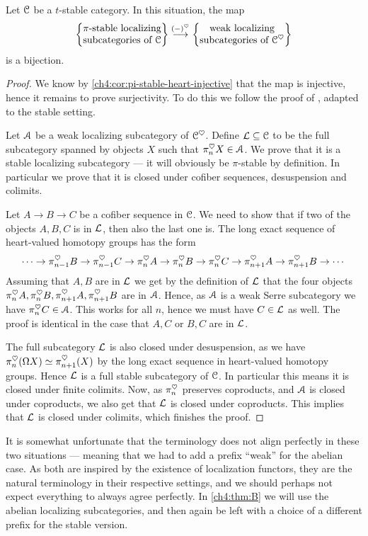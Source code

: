 \begin{theorem}
    \label{ch4:thm:premain}
    Let $\EuScript{C}$ be a $t$-stable category. In this situation, the map 
    \[\left\{ \begin{matrix} \pi\text{-stable localizing}\\ \text{subcategories of }\EuScript{C} \end{matrix} \right\}\overset{(-)^\heartsuit}{\longrightarrow} \left\{ \begin{matrix} \text{weak localizing}\\ \text{subcategories of }\EuScript{C}^\heartsuit \end{matrix} \right\}\] 
    is a bijection. 
\end{theorem}
\begin{proof}
    We know by \cref{ch4:cor:pi-stable-heart-injective} that the map is injective, hence it remains to prove surjectivity. To do this we follow the proof of \cite[C.5.2.7]{lurie_SAG}, adapted to the stable setting. 
    
    Let $\EuScript{A}$ be a weak localizing subcategory of $\EuScript{C}^\heartsuit$. Define $\mathcal{L}\subseteq \EuScript{C}$ to be the full subcategory spanned by objects $X$ such that $\pi_n^\heartsuit X\in \EuScript{A}$. We prove that it is a stable localizing subcategory --- it will obviously be $\pi$-stable by definition. In particular we prove that it is closed under cofiber sequences, desuspension and colimits. 

    Let $A\rightarrow B\rightarrow C$ be a cofiber sequence in $\EuScript{C}$. We need to show that if two of the objects $A, B, C$ is in $\mathcal{L}$, then also the last one is. The long exact sequence of heart-valued homotopy groups has the form 
    \[\cdots\rightarrow \pi^{\heartsuit}_{n-1}B \rightarrow \pi^{\heartsuit}_{n-1}C \rightarrow \pi^{\heartsuit}_{n}A \rightarrow \pi^{\heartsuit}_{n}B \rightarrow \pi^{\heartsuit}_{n}C \rightarrow \pi^{\heartsuit}_{n+1}A\rightarrow \pi^{\heartsuit}_{n+1}B \rightarrow \cdots \]
    Assuming that $A, B$ are in $\mathcal{L}$ we get by the definition of $\mathcal{L}$ that the four objects $\pi^{\heartsuit}_{n}A, \pi^{\heartsuit}_{n}B, \pi^{\heartsuit}_{n+1}A, \pi^{\heartsuit}_{n+1}B$ are in $\EuScript{A}$. Hence, as $\EuScript{A}$ is a weak Serre subcategory we have $\pi^\heartsuit_n C\in \EuScript{A}$. This works for all $n$, hence we must have $C\in \mathcal{L}$ as well. The proof is identical in the case that $A, C$ or $B, C$ are in $\mathcal{L}$. 
    
    The full subcategory $\mathcal{L}$ is also closed under desuspension, as we have $\pi_n^\heartsuit (\Omega X)\simeq \pi_{n+1}^\heartsuit(X)$ by the long exact sequence in heart-valued homotopy groups. Hence $\mathcal{L}$ is a full stable subcategory of $\EuScript{C}$. In particular this means it is closed under finite colimits. Now, as $\pi_n^\heartsuit$ preserves coproducts, and $\EuScript{A}$ is closed under coproducts, we also get that $\mathcal{L}$ is closed under coproducts. This implies that $\mathcal{L}$ is closed under colimits, which finishes the proof. 
\end{proof}

\begin{remark}
    It is somewhat unfortunate that the terminology does not align perfectly in these two situations --- meaning that we had to add a prefix ``weak'' for the abelian case. As both are inspired by the existence of localization functors, they are the natural terminology in their respective settings, and we should perhaps not expect everything to always agree perfectly. In \cref{ch4:thm:B} we will use the abelian localizing subcategories, and then again be left with a choice of a different prefix for the stable version. 
\end{remark}

